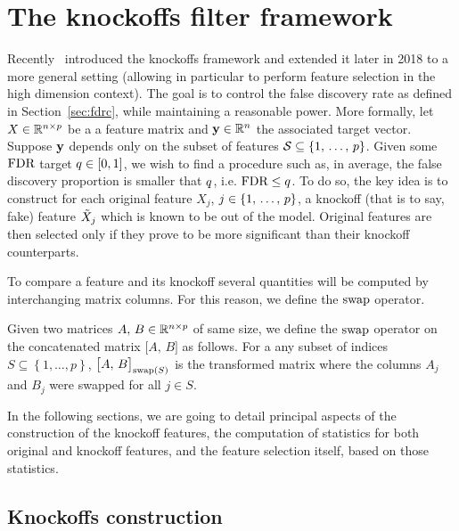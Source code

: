 \chapter{The knockoffs filter framework}\label{ch:knockoffs}

Recently~\cite{fixed_x_knockoffs} introduced the knockoffs framework and extended it later in 2018 to a more general setting
(allowing in particular to perform feature selection in the high dimension context).
The goal is to control the false discovery rate as defined in Section~\ref{sec:fdrc},
while maintaining a reasonable power.
More formally, let $X \in \mathbb{R}^{n \times p}$ be a a feature matrix and $\mathbf{y} \in \mathbb{R}^n$ the associated target vector.
Suppose $\mathbf{y}$ depends only on the subset of features $\mathcal{S} \subseteq \left\{ 1,\, \dots,\, p \right\}$.
Given some $\text{FDR}$ target $q \in [0, 1]$, we wish to find a procedure such as, in average,
the false discovery proportion is smaller that $q$, i.e. $\text{FDR} \leq q$.
To do so, the key idea is to construct for each original feature $X_j$, $j \in \left\{ 1,\, \dots,\, p \right\}$,
a knockoff (that is to say, fake) feature $\tilde{X}_j$ which is known to be out of the model.
Original features are then selected only if they prove to be more significant than their knockoff counterparts.

To compare a feature and its knockoff several quantities will be computed by interchanging matrix columns.
For this reason, we define the $\operatorname{swap}$ operator.
\begin{definition}\label{def:swap}
    Given two matrices $A,\,B \in \mathbb{R}^{n \times p}$ of same size,
    we define the $\operatorname{swap}$ operator on the concatenated matrix $\big[ A,\, B \big]$ as follows.
    For a any subset of indices $S \subseteq \left\{ 1, \dots, p \right\}$,
    $\big[ A,\, B \big]_{\operatorname{swap}(S)}$ is the transformed matrix where the columns $A_j$ and $B_j$ were swapped for all
    $j \in S$.
\end{definition}

In the following sections, we are going to detail principal aspects of the construction of the knockoff features,
the computation of statistics for both original and knockoff features,
and the feature selection itself, based on those statistics.

\section{Knockoffs construction}\label{sec:kc}

